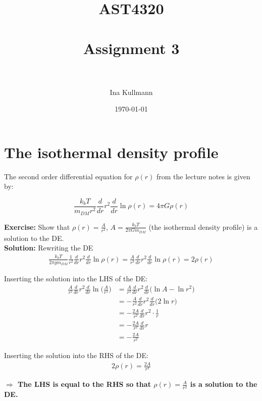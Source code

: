 \documentclass[paper=a4, fontsize=11pt]{scrartcl} %
\title{	
\normalfont \normalsize 
\textsc{AST4320} \\ [25pt] %
\horrule{0.5pt} \\[0.4cm] %
\huge Assignment 3 \\ %
\horrule{2pt} \\[0.5cm] %
}
\author{Ina Kullmann} %
\date{\normalsize\today} %
\numberwithin{figure}{section} %
\numberwithin{table}{section} %
\begin{document}
\maketitle %


\section{The isothermal density profile}

The second order differential equation for $\rho(r)$ from the lecture notes is given by:

\begin{equation}
\frac{k_bT}{m_{DM}r^2} \frac{d}{dr}r^2 \frac{d}{dr} \ln \rho(r) = 4\pi G\rho(r)
\label{eq:DE}
\end{equation}

\textbf{Exercise:}  Show that $\rho(r) = \frac{A}{r^2}$, $A=\frac{k_bT}{2\pi Gm_{DM}}$ (the isothermal density profile) is a solution to the DE.\\

\textbf{Solution:} Rewriting the DE
\begin{align*}
\frac{k_bT}{2\pi gm_{DM}} \frac{1}{r^2} \frac{d}{dr}r^2 \frac{d}{dr} \ln \rho(r) = \frac{A}{r^2} \frac{d}{dr}r^2 \frac{d}{dr} \ln \rho(r) = 2\rho(r)
\end{align*}

Inserting the solution into the LHS of the DE:
\begin{align*}
\frac{A}{r^2} \frac{d}{dr}r^2 \frac{d}{dr} \ln \Bigg(\frac{A}{r^2} \Bigg) &=  \frac{A}{r^2} \frac{d}{dr}r^2 \frac{d}{dr} \Bigg( \ln A - \ln r^2 \Bigg) \\
&= -\frac{A}{r^2} \frac{d}{dr}r^2 \frac{d}{dr} \Bigg( 2 \ln r \Bigg) \\
&= -\frac{2A}{r^2} \frac{d}{dr}r^2 \cdot \frac{1}{r} \\
&= -\frac{2A}{r^2} \frac{d}{dr}r \\
&= -\frac{2A}{r^2} 
\end{align*}

Inserting the solution into the RHS of the DE:
\begin{align*}
2\rho(r) = \frac{2A}{r^2}
\end{align*}

\textbf{$\Rightarrow$ The LHS is equal to the RHS so that $\rho(r) = \frac{A}{r^2}$ is a solution to the DE.} \\
\end{document}
